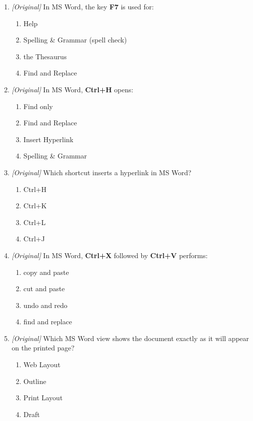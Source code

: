 \begin{enumerate}[label=\textbf{Q\arabic*.}, leftmargin=*]
\item \textit{[Original]} In MS Word, the key \textbf{F7} is used for:
  \begin{enumerate}[label=\Alph*.]
    \item Help
    \item Spelling \& Grammar (spell check)
    \item the Thesaurus
    \item Find and Replace
  \end{enumerate}
\item \textit{[Original]} In MS Word, \textbf{Ctrl+H} opens:
  \begin{enumerate}[label=\Alph*.]
    \item Find only
    \item Find and Replace
    \item Insert Hyperlink
    \item Spelling \& Grammar
  \end{enumerate}
\item \textit{[Original]} Which shortcut inserts a hyperlink in MS Word?
  \begin{enumerate}[label=\Alph*.]
    \item Ctrl+H
    \item Ctrl+K
    \item Ctrl+L
    \item Ctrl+J
  \end{enumerate}
\item \textit{[Original]} In MS Word, \textbf{Ctrl+X} followed by
  \textbf{Ctrl+V} performs:
  \begin{enumerate}[label=\Alph*.]
    \item copy and paste
    \item cut and paste
    \item undo and redo
    \item find and replace
  \end{enumerate}
\item \textit{[Original]} Which MS Word view shows the document exactly as it
  will appear on the printed page?
  \begin{enumerate}[label=\Alph*.]
    \item Web Layout
    \item Outline
    \item Print Layout
    \item Draft
  \end{enumerate}

\end{enumerate}
